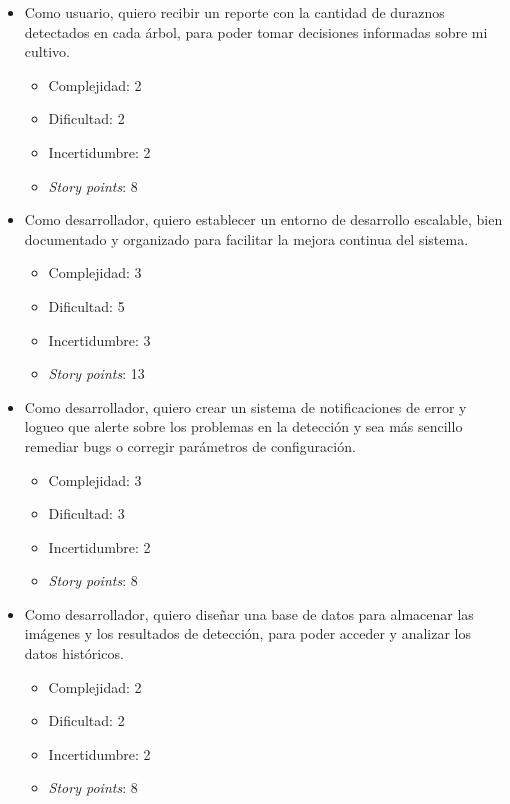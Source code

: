 \documentclass[
11pt %
]{charter}
\begin{document}
\begin{itemize}
\item Como usuario, quiero recibir un reporte con la cantidad de duraznos detectados en cada árbol, para poder tomar decisiones informadas sobre mi cultivo.
	\begin{itemize}
	\item Complejidad: 2
	\item Dificultad: 2
	\item Incertidumbre: 2
	\item \textit{Story points}: 8 
	\end{itemize}
\end{itemize}

\begin{itemize}
\item Como desarrollador, quiero establecer un entorno de desarrollo escalable, bien documentado y organizado para facilitar la mejora continua del sistema.
	\begin{itemize}
	\item Complejidad: 3
	\item Dificultad: 5
	\item Incertidumbre: 3
	\item \textit{Story points}: 13 
	\end{itemize}
\end{itemize}

\begin{itemize}
\item Como desarrollador, quiero crear un sistema de notificaciones de error y logueo que alerte sobre los problemas en la detección y sea más sencillo remediar bugs o corregir parámetros de configuración.
	\begin{itemize}
	\item Complejidad: 3
	\item Dificultad: 3
	\item Incertidumbre: 2
	\item \textit{Story points}: 8 
	\end{itemize}
\end{itemize}

\begin{itemize}
\item Como desarrollador, quiero diseñar una base de datos para almacenar las imágenes y los resultados de detección, para poder acceder y analizar los datos históricos.
	\begin{itemize}
	\item Complejidad: 2
	\item Dificultad: 2
	\item Incertidumbre: 2
	\item \textit{Story points}: 8 
	\end{itemize}
\end{itemize}
\end{document}
